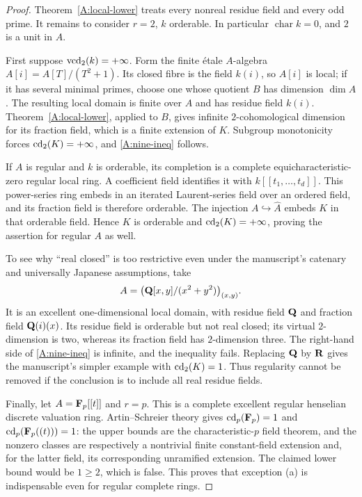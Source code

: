 \begin{proof}
Theorem~\ref{A:local-lower} treats every nonreal residue field and every odd prime. It remains to consider $r=2$, $k$ orderable. In particular $\operatorname{char}k=0$, and $2$ is a unit in $A$.

First suppose $\operatorname{vcd}_2(k)=+\infty$. Form the finite étale $A$-algebra $A[i]=A[T]/(T^2+1)$. Its closed fibre is the field $k(i)$, so $A[i]$ is local; if it has several minimal primes, choose one whose quotient $B$ has dimension $\dim A$. The resulting local domain is finite over $A$ and has residue field $k(i)$. Theorem~\ref{A:local-lower}, applied to $B$, gives infinite $2$-cohomological dimension for its fraction field, which is a finite extension of $K$. Subgroup monotonicity forces $\operatorname{cd}_2(K)=+\infty$, and \eqref{A:nine-ineq} follows.

If $A$ is regular and $k$ is orderable, its completion is a complete equicharacteristic-zero regular local ring. A coefficient field identifies it with $k[[t_1,\ldots,t_d]]$. This power-series ring embeds in an iterated Laurent-series field over an ordered field, and its fraction field is therefore orderable. The injection $A\hookrightarrow\widehat A$ embeds $K$ in that orderable field. Hence $K$ is orderable and $\operatorname{cd}_2(K)=+\infty$, proving the assertion for regular $A$ as well.

To see why ``real closed'' is too restrictive even under the manuscript's catenary and universally Japanese assumptions, take
\[
A=\bigl(\mathbf Q[x,y]/(x^2+y^2)\bigr)_{(x,y)}.
\]
It is an excellent one-dimensional local domain, with residue field $\mathbf Q$ and fraction field $\mathbf Q(i)(x)$. Its residue field is orderable but not real closed; its virtual $2$-dimension is two, whereas its fraction field has $2$-dimension three. The right-hand side of \eqref{A:nine-ineq} is infinite, and the inequality fails. Replacing $\mathbf Q$ by $\mathbf R$ gives the manuscript's simpler example with $\operatorname{cd}_2(K)=1$. Thus regularity cannot be removed if the conclusion is to include all real residue fields.

Finally, let $A=\mathbf F_p[[t]]$ and $r=p$. This is a complete excellent regular henselian discrete valuation ring. Artin--Schreier theory gives $\operatorname{cd}_p(\mathbf F_p)=1$ and $\operatorname{cd}_p(\mathbf F_p((t)))=1$: the upper bounds are the characteristic-$p$ field theorem, and the nonzero classes are respectively a nontrivial finite constant-field extension and, for the latter field, its corresponding unramified extension. The claimed lower bound would be $1\geq2$, which is false. This proves that exception (a) is indispensable even for regular complete rings.
\end{proof}

